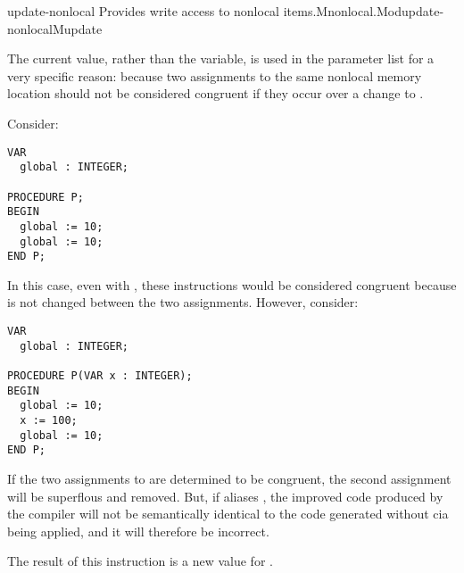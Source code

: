 \begin{instruction}{update-nonlocal}
   {Provides write access to
    nonlocal items.}{Mnonlocal.Mod}{update-nonlocal}{Mupdate}


\begin{notes}
  The current value, rather than the variable,  is used in
  the parameter list for a very specific reason: because two
  assignments to the same nonlocal memory location should not be
  considered congruent if they occur over a change to .

  Consider:
\begin{verbatim}
VAR
  global : INTEGER;

PROCEDURE P;
BEGIN
  global := 10;
  global := 10;
END P;
\end{verbatim}

  In this case, even with , these instructions would be
  considered congruent because  is not changed between the
  two assignments.  However, consider:

\begin{verbatim}
VAR
  global : INTEGER;

PROCEDURE P(VAR x : INTEGER);
BEGIN
  global := 10;
  x := 100;
  global := 10;
END P;
\end{verbatim}

  If the two assignments to  are determined to be
  congruent, the second assignment will be superflous and removed.
  But, if  aliases , the improved code produced
  by the compiler will not be semantically identical to the code
  generated without \acs{cia} being applied, and it will therefore be
  incorrect.
\end{notes}

  \begin{results}
  \item The result of this instruction is a new value for
    .
  \end{results}

  \begin{operands}
  \item {}
  \item {}
  \item {}
  \item {}
  \end{operands}

  \begin{seealso}
  \end{seealso}
\end{instruction}


